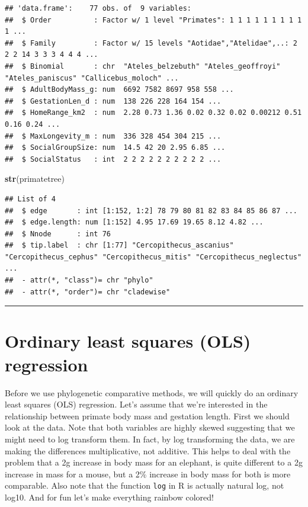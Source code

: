 \documentclass[]{book}
\newenvironment{Shaded}{\begin{snugshade}}{\end{snugshade}}
\newcommand{\KeywordTok}[1]{\textcolor[rgb]{0.13,0.29,0.53}{\textbf{{#1}}}}
\newcommand{\NormalTok}[1]{{#1}}
\begin{document}
\begin{verbatim}
## 'data.frame':    77 obs. of  9 variables:
##  $ Order          : Factor w/ 1 level "Primates": 1 1 1 1 1 1 1 1 1 1 ...
##  $ Family         : Factor w/ 15 levels "Aotidae","Atelidae",..: 2 2 2 14 3 3 3 4 4 4 ...
##  $ Binomial       : chr  "Ateles_belzebuth" "Ateles_geoffroyi" "Ateles_paniscus" "Callicebus_moloch" ...
##  $ AdultBodyMass_g: num  6692 7582 8697 958 558 ...
##  $ GestationLen_d : num  138 226 228 164 154 ...
##  $ HomeRange_km2  : num  2.28 0.73 1.36 0.02 0.32 0.02 0.00212 0.51 0.16 0.24 ...
##  $ MaxLongevity_m : num  336 328 454 304 215 ...
##  $ SocialGroupSize: num  14.5 42 20 2.95 6.85 ...
##  $ SocialStatus   : int  2 2 2 2 2 2 2 2 2 2 ...
\end{verbatim}

\begin{Shaded}
\begin{Highlighting}[]
\KeywordTok{str}\NormalTok{(primatetree)}
\end{Highlighting}
\end{Shaded}

\begin{verbatim}
## List of 4
##  $ edge       : int [1:152, 1:2] 78 79 80 81 82 83 84 85 86 87 ...
##  $ edge.length: num [1:152] 4.95 17.69 19.65 8.12 4.82 ...
##  $ Nnode      : int 76
##  $ tip.label  : chr [1:77] "Cercopithecus_ascanius" "Cercopithecus_cephus" "Cercopithecus_mitis" "Cercopithecus_neglectus" ...
##  - attr(*, "class")= chr "phylo"
##  - attr(*, "order")= chr "cladewise"
\end{verbatim}

\begin{center}\rule{0.5\linewidth}{\linethickness}\end{center}

\section{Ordinary least squares (OLS)
regression}\label{ordinary-least-squares-ols-regression}

Before we use phylogenetic comparative methods, we will quickly do an
ordinary least squares (OLS) regression. Let's assume that we're
interested in the relationship between primate body mass and gestation
length. First we should look at the data. Note that both variables are
highly skewed suggesting that we might need to log transform them. In
fact, by log transforming the data, we are making the differences
multiplicative, not additive. This helps to deal with the problem that a
2g increase in body mass for an elephant, is quite different to a 2g
increase in mass for a mouse, but a 2\% increase in body mass for both
is more comparable. Also note that the function \texttt{log} in R is
actually natural log, not log10. And for fun let's make everything
rainbow colored!
\end{document}
